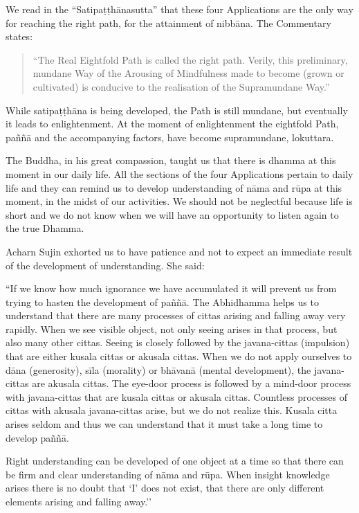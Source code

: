 We read in the ``Satipaṭṭhānasutta'' that these four Applications are the only way for reaching the right path, for the attainment of nibbāna. The Commentary states:

\begin{quote}
``The Real Eightfold Path is called the right path. Verily, this preliminary, mundane Way of the Arousing of Mindfulness made to become (grown or cultivated) is conducive to the realisation of the Supramundane Way.''
\end{quote}

While satipaṭṭhāna is being developed, the Path is still mundane, but eventually it leads to enlightenment. At the moment of enlightenment the eightfold Path, paññā and the accompanying factors, have become supramundane, lokuttara.

The Buddha, in his great compassion, taught us that there is dhamma at this moment in our daily life. All the sections of the four Applications pertain to daily life and they can remind us to develop understanding of nāma and rūpa at this moment, in the midst of our activities. We should not be neglectful because life is short and we do not know when we will have an opportunity to listen again to the true Dhamma.

Acharn Sujin exhorted us to have patience and not to expect an immediate result of the development of understanding. She said:

``If we know how much ignorance we have accumulated it will prevent us from trying to hasten the development of paññā. The Abhidhamma helps us to understand that there are many processes of cittas arising and falling away very
rapidly. When we see visible object, not only seeing arises in that process, but also many other cittas. Seeing is closely followed by the javana-cittas (impulsion) that are either kusala cittas or akusala cittas. When we do not apply ourselves to dāna (generosity), sīla (morality) or bhāvanā (mental development), the javana-cittas are akusala cittas. The eye-door process is followed by a mind-door process with javana-cittas that are kusala cittas or akusala cittas. Countless processes of cittas with akusala javana-cittas arise, but we do not realize this. Kusala citta arises seldom and thus we can understand that it must take a long time to develop paññā.

Right understanding can be developed of one object at a time so that there can be firm and clear understanding of nāma and rūpa. When insight knowledge arises there is no doubt that `I’ does not exist, that there are only different elements arising and falling away.''

